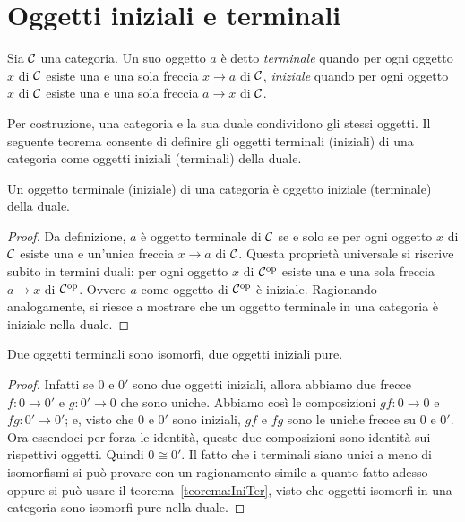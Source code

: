 
\section{Oggetti iniziali e terminali}

\begin{definizione}
Sia \(\mathcal C\) una categoria. Un suo oggetto \(a\) è detto {\em terminale} quando per ogni oggetto \(x\) di \(\mathcal C\) esiste una e una sola freccia \(x \to a\) di \(\mathcal C\), {\em iniziale} quando per ogni oggetto \(x\) di \(\mathcal C\) esiste una e una sola freccia \(a \to x\) di \(\mathcal C\).
\end{definizione}

Per costruzione, una categoria e la sua duale condividono gli stessi oggetti. Il seguente teorema consente di definire gli oggetti terminali (iniziali) di una categoria come oggetti iniziali (terminali) della duale.

\begin{teorema}\label{teorema:IniTer}
Un oggetto terminale (iniziale) di una categoria è oggetto iniziale (terminale) della duale. 
\end{teorema}

\begin{proof}
Da definizione, \(a\) è oggetto terminale di \(\mathcal C\) se e solo se per ogni {\rosso oggetto \(x\) di \(\mathcal C\)} esiste una e un'unica {\blu freccia \(x \to a\) di \(\mathcal C\)}. Questa proprietà universale si riscrive subito in termini duali: per ogni {\rosso oggetto \(x\) di \(\mathcal C^\text{op}\)} esiste una e una sola {\blu freccia \(a \to x\) di \(\mathcal C^\text{op}\)}. Ovvero \(a\) come oggetto di \(\mathcal C^\text{op}\) è iniziale. Ragionando analogamente, si riesce a mostrare che un oggetto terminale in una categoria è iniziale nella duale.
\end{proof}

\begin{teorema}
Due oggetti terminali sono isomorfi, due oggetti iniziali pure.
\end{teorema}

\begin{proof}
Infatti se \(0\) e \(0'\) sono due oggetti iniziali, allora abbiamo due frecce \(f : 0 \to 0'\) e \(g : 0' \to 0\) che sono uniche. Abbiamo così le composizioni \(gf : 0 \to 0\) e \(fg : 0' \to 0'\); e, visto che \(0\) e \(0'\) sono iniziali, \(gf\) e \(fg\) sono le uniche frecce su \(0\) e \(0'\). Ora essendoci per forza le identità, queste due composizioni sono identità sui rispettivi oggetti. Quindi \(0 \cong 0'\).\newline
Il fatto che i terminali siano unici a meno di isomorfismi si può provare con un ragionamento simile a quanto fatto adesso oppure si può usare il teorema~\ref{teorema:IniTer}, visto che oggetti isomorfi in una categoria sono isomorfi pure nella duale.
\end{proof}

